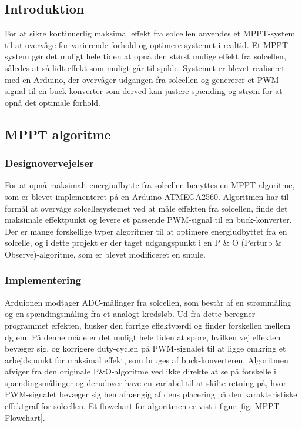 \documentclass[../main.tex]{subfiles}
\begin{document}
\subsection{Introduktion}

For at sikre kontinuerlig maksimal effekt fra solcellen anvendes et MPPT-system til at overvåge for varierende forhold og optimere systemet i realtid. Et MPPT-system gør det muligt hele tiden at opnå den størst mulige effekt fra solcellen, således at så lidt effekt som muligt går til spilde. Systemet er blevet realiseret med en Arduino, der overvåger udgangen fra solcellen og genererer et PWM-signal til en buck-konverter som derved kan justere spænding og strøm for at opnå det optimale forhold. 

\subsection{MPPT algoritme}
\subsubsection{Designovervejelser}
For at opnå maksimalt energiudbytte fra solcellen benyttes en MPPT-algoritme, som er blevet implementeret på en Arduino ATMEGA2560. Algoritmen har til formål at overvåge solcellesystemet ved at måle effekten fra solcellen, finde det maksimale effektpunkt og levere et passende PWM-signal til en buck-konverter. Der er mange forskellige typer algoritmer til at optimere energiudbyttet fra en solcelle, og i dette projekt er der taget udgangspunkt i en P \& O (Perturb \& Observe)-algoritme, som er blevet modificeret en smule.

\subsubsection{Implementering}
Arduionen modtager ADC-målinger fra solcellen, som består af en strømmåling og en spændingsmåling fra et analogt kredsløb. Ud fra dette beregner programmet effekten, husker den forrige effektværdi og finder forskellen mellem dg em. På denne måde er det muligt hele tiden at spore, hvilken vej effekten bevæger sig, og korrigere duty-cyclen på PWM-signalet til at ligge omkring et arbejdspunkt for maksimal effekt, som bruges af buck-konverteren. Algoritmen afviger fra den originale P\&O-algoritme ved ikke direkte at se på forskelle i spændingsmålinger og derudover have en variabel til at skifte retning på, hvor PWM-signalet bevæger sig hen afhængig af dens placering på den karakteristiske effektgraf for solcellen. Et flowchart for algoritmen er vist i figur \ref{fig: MPPT Flowchart}.
        
\end{document}

